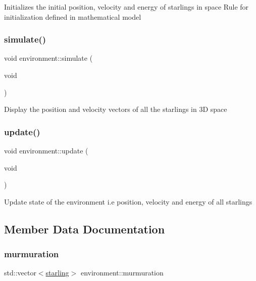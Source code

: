 Initializes the initial position, velocity and energy of starlings in space Rule for initialization defined in mathematical model \mbox{\label{classenvironment_a60eddb68039d6c5f3b98e568e02346d7}} 
\subsubsection{\texorpdfstring{simulate()}{simulate()}}
{\footnotesize\ttfamily void environment\+::simulate (\begin{DoxyParamCaption}\item[{void}]{ }\end{DoxyParamCaption})}

Display the position and velocity vectors of all the starlings in 3D space \mbox{\label{classenvironment_a0ccbf5c41be42b0d43a079517b2c7299}} 
\subsubsection{\texorpdfstring{update()}{update()}}
{\footnotesize\ttfamily void environment\+::update (\begin{DoxyParamCaption}\item[{void}]{ }\end{DoxyParamCaption})}

Update state of the environment i.\+e position, velocity and energy of all starlings 

\subsection{Member Data Documentation}
\mbox{\label{classenvironment_a47dbbdcd0b1eb003df03062c5923e8d3}} 
\subsubsection{\texorpdfstring{murmuration}{murmuration}}
{\footnotesize\ttfamily std\+::vector$<$\mbox{\hyperlink{classstarling}{starling}}$>$ environment\+::murmuration}



